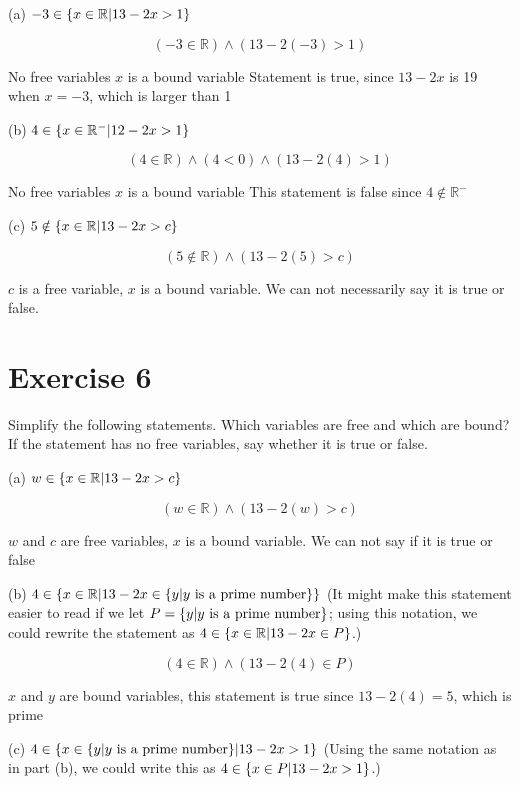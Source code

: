 \documentclass[11pt]{article}
\begin{document}
\noindent (a) $-3 \in \{x \in \mathbb{R} \text{\textbar} 13 - 2x > 1\}$

$$(-3 \in \mathbb{R}) \wedge (13 - 2(-3) > 1)$$

No free variables
$x$ is a bound variable
Statement is true, since $13 - 2x$ is 19 when $x=-3$, which is larger than 1

\noindent (b) $4 \in \{x \in \mathbb{R}^- \text{\textbar} 12 - 2x > 1 \}$

$$(4 \in \mathbb{R}) \wedge (4 < 0) \wedge (13 - 2(4) > 1)$$

No free variables
$x$ is a bound variable
This statement is false since $4 \notin \mathbb{R}^-$

\noindent (c) $5 \notin \{x \in \mathbb{R} \text{\textbar} 13 - 2x > c\}$

$$(5 \notin \mathbb{R}) \wedge (13 - 2(5) > c)$$

$c$ is a free variable, $x$ is a bound variable. We can not necessarily say it is true or false.

\section*{Exercise 6}

Simplify the following statements. Which variables are free and which are bound? If the statement has no free variables, say whether it is true or false.

\noindent (a) $w \in \{x \in \mathbb{R} \text{\textbar} 13-2x > c\}$

$$(w \in \mathbb{R}) \wedge (13-2(w) > c)$$

$w$ and $c$ are free variables, $x$ is a bound variable. We can not say if it is true or false

\noindent (b) $4 \in \{x \in \mathbb{R} \text{\textbar} 13 - 2x \in \{y \text{\textbar} y \text{ is a prime number}\}\}$
(It might make this statement easier to read if we let $P = \{y \text{\textbar} y \text{ is a prime number}\}$;
using this notation, we could rewrite the statement as 
$4 \in \{x \in \mathbb{R} \text{\textbar} 13 - 2x \in P\}$.)

$$(4 \in \mathbb{R}) \wedge (13 - 2(4) \in P)$$

$x$ and $y$ are bound variables, this statement is true since $13 - 2(4) = 5$, which is prime

\noindent (c) $4 \in \{x \in \{y \text{\textbar} y \text{ is a prime number}\} \text{\textbar} 13 - 2x > 1\}$
(Using the same notation as in part (b), we could write this as $4 \in \{x \in P \text{\textbar} 13 - 2x > 1\}$.)
\end{document}

